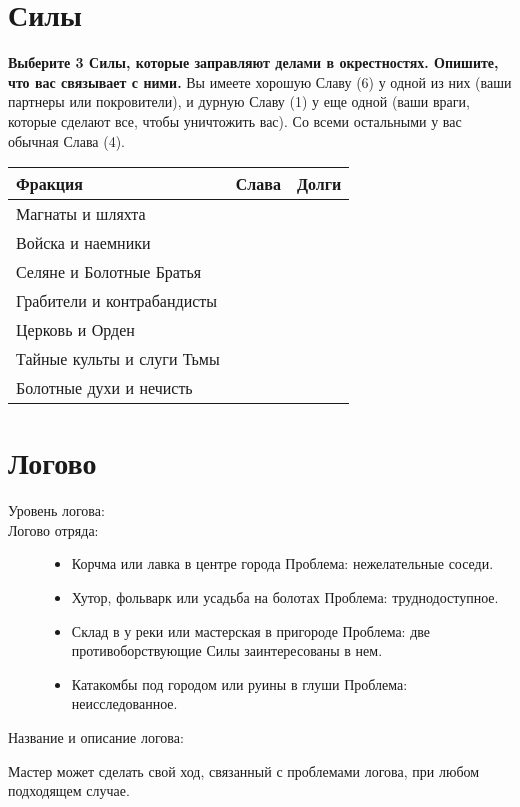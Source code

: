\documentclass[10pt,twoside]{report}
\begin{document}
\section*{Силы}
{\bfseries Выберите 3 Силы, которые заправляют делами в
  окрестностях. Опишите, что вас связывает с ними.} Вы имеете хорошую
Славу (6) у одной из них (ваши партнеры или покровители), и дурную
Славу (1) у еще одной (ваши враги, которые сделают все, чтобы
уничтожить вас). Со всеми остальными у вас обычная Слава (4).

\vfill
\begin{tabular}{l l l}
  Фракция & Слава & Долги \\
  \hline
  Магнаты и шляхта & & \\
  Войска и наемники & & \\
  Селяне и Болотные Братья & & \\
  Грабители и контрабандисты & & \\
  Церковь и Орден & & \\
  Тайные культы и слуги Тьмы & & \\
  Болотные духи и нечисть & & \\ 
\end{tabular}
\vfill
\pagebreak

\section*{Логово}
\begin{description}
\item[Уровень логова:]
\item[Логово отряда:]
  \begin{itemize}
    \item Корчма или лавка в центре города
      Проблема: нежелательные соседи.
    \item Хутор, фольварк или усадьба на болотах
      Проблема: труднодоступное.
    \item Склад в у реки или мастерская в пригороде
      Проблема: две противоборствующие Силы заинтересованы в
      нем.
    \item Катакомбы под городом или руины в глуши
      Проблема: неисследованное. 
    \end{itemize}
\item[Название и описание логова:] 
\end{description}

Мастер может сделать свой
ход, связанный с проблемами логова, при любом подходящем случае.
\vfill
\pagebreak
\end{document}
